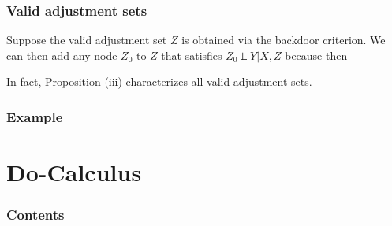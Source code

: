 \documentclass{beamer}
\begin{document}
\begin{frame}
    \frametitle{Valid adjustment sets}
    \begin{flushleft}
        Suppose the valid adjustment set $Z$ is obtained via the backdoor criterion. We can then add any node $Z_0$ to 
        $Z$ that satisfies $Z_0\Vbar Y|X, Z$ because then
    \end{flushleft}
    \begin{flushleft}
        In fact, Proposition (iii) characterizes all valid adjustment sets. 
    \end{flushleft}
\end{frame}

\begin{frame}
    \frametitle{Example}
\end{frame}




\section{Do-Calculus}

\begin{frame}
    \frametitle{Contents}
    \tableofcontents[currentsection]
\end{frame}
\end{document}
